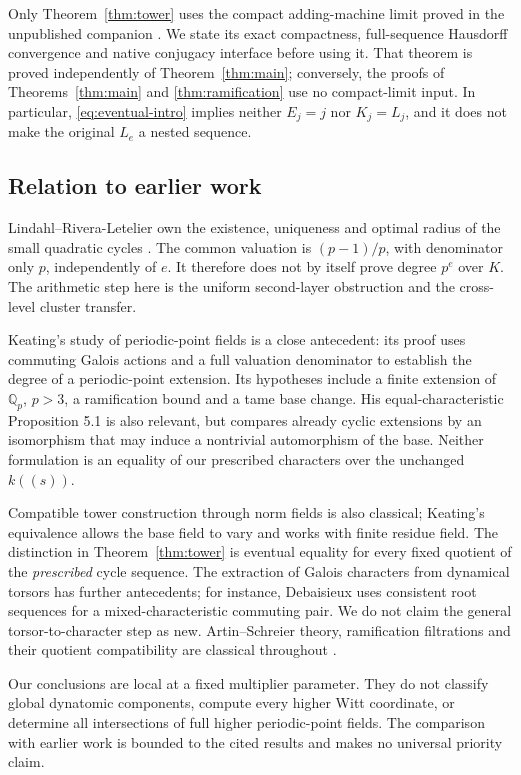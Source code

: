 Only Theorem~\ref{thm:tower} uses the compact adding-machine limit
proved in the unpublished companion \cite[Theorem 1.1]{companion2026haar}.
We state its exact compactness, full-sequence Hausdorff convergence
and native conjugacy interface before using it. That theorem is
proved independently of Theorem~\ref{thm:main}; conversely, the
proofs of Theorems~\ref{thm:main} and \ref{thm:ramification}
use no compact-limit input. In particular,
\eqref{eq:eventual-intro} implies neither \(E_j=j\) nor \(K_j=L_j\),
and it does not make the original \(L_e\) a nested sequence.

\subsection*{Relation to earlier work}

Lindahl--Rivera-Letelier own the existence, uniqueness and optimal
radius of the small quadratic cycles
\cite{lindahl2016optimal}. The common valuation is
\((p-1)/p\), with denominator only \(p\), independently of \(e\).
It therefore does not by itself prove degree \(p^e\) over \(K\).
The arithmetic step here is the uniform second-layer obstruction
and the cross-level cluster transfer.

Keating's study of periodic-point fields
\cite[Theorem 6.1]{keating2006extensions} is a close antecedent:
its proof uses commuting Galois actions and a full valuation
denominator to establish the degree of a periodic-point extension.
Its hypotheses include a finite extension of \(\mathbb Q_p\),
\(p>3\), a ramification bound and a tame base change.
His equal-characteristic Proposition 5.1 is also relevant, but
compares already cyclic extensions by an isomorphism that may
induce a nontrivial automorphism of the base.
Neither formulation is an equality of our prescribed characters
over the unchanged \(k((s))\).

Compatible tower construction through norm fields is also classical;
Keating's equivalence \cite[Theorem 1.1 and Section 3]{keating2009wintenberger}
allows the base field to vary and works with finite residue field.
The distinction in Theorem~\ref{thm:tower} is eventual equality
for every fixed quotient of the \emph{prescribed} cycle sequence.
The extraction of Galois characters from dynamical torsors has
further antecedents; for instance, Debaisieux
\cite[Propositions 2.1--2.3]{debaisieux2026lubin} uses
consistent root sequences for a mixed-characteristic commuting pair.
We do not claim the general torsor-to-character step as new.
Artin--Schreier theory, ramification filtrations and their quotient
compatibility are classical throughout \cite{elder2025artin}.

Our conclusions are local at a fixed multiplier parameter. They
do not classify global dynatomic components, compute every higher
Witt coordinate, or determine all intersections of full higher
periodic-point fields. The comparison with earlier work is bounded
to the cited results and makes no universal priority claim.
